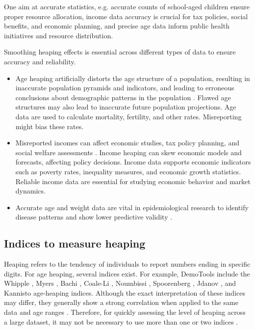 \documentclass[pdflatex,sn-mathphys-num]{sn-jnl}%
\theoremstyle{thmstyleone}%
\theoremstyle{thmstyletwo}%
\theoremstyle{thmstylethree}%
\begin{document}
One aim at accurate statistics, e.g. accurate counts of school-aged children ensure proper resource allocation, income data accuracy is crucial for tax policies, social benefits, and economic planning, and precise age data inform public health initiatives and resource distribution.

Smoothing heaping effects is essential across different types of data to ensure accuracy and reliability. 


\begin{itemize}
    \item  
    Age heaping artificially distorts the age structure of a population, resulting in inaccurate population pyramids and indicators, and leading to erroneous conclusions about demographic patterns in the population \citep{un13}.
    Flawed age structures may also lead to inaccurate future population projections. Age data are used to calculate mortality, fertility, and other rates. Misreporting might bias these rates.
    \item Misreported incomes can affect economic studies, tax policy planning, and social welfare assessments \citep{seiver78}. Income heaping can skew economic models and forecasts, affecting policy decisions. Income data supports economic indicators such as poverty rates, inequality measures, and economic growth statistics. Reliable income data are essential for studying economic behavior and market dynamics. 
    \item Accurate age and weight data are vital in epidemiological research to identify disease patterns and show lower predictive validity \citep{stavrakantonaki17}.
\end{itemize}







\subsection{Indices to measure heaping}

Heaping refers to the tendency of individuals to report numbers ending in specific digits.
For age heaping, several indices exist. 
For example, DemoTools \citep{aburto2022} include the Whipple \citep{spoorenberg2007}, Myers \citep{myers1954}, Bachi \citep{bachi1951}, Coale-Li \citep{coale1991}, Noumbissi \citep{noumbissi1992}, Spoorenberg \citep{spoorenberg2007}, Jdanov \citep{jdanov2008}, and Kannisto \citep{kannisto1999} age-heaping indices. Although the exact interpretation of these indices may differ, they generally show a strong correlation when applied to the same data and age ranges \citep{aburto2022}. Therefore, for quickly assessing the level of heaping across a large dataset, it may not be necessary to use more than one or two indices \citep{aburto2022}.
\end{document}
